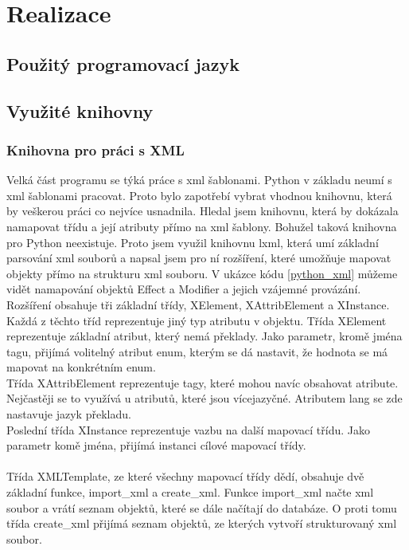 \documentclass[thesis=B,czech]{resources/FITthesis}[2012/06/26]
\begin{document}
\chapter{Realizace}
\section{Použitý programovací jazyk}

\section{Využité knihovny}
\subsection{Knihovna pro práci s XML}
Velká část programu se týká práce s xml šablonami. Python v základu neumí s xml šablonami pracovat. Proto bylo zapotřebí vybrat vhodnou knihovnu, která by veškerou práci co nejvíce usnadnila. Hledal jsem knihovnu, která by dokázala namapovat třídu a její atributy přímo na xml šablony. Bohužel taková knihovna pro Python neexistuje. Proto jsem využil knihovnu lxml, která umí základní parsování xml souborů a napsal jsem pro ní rozšíření, které umožňuje mapovat objekty přímo na strukturu xml souboru. V ukázce kódu \ref{python_xml} můžeme vidět namapování objektů Effect a Modifier a jejich vzájemné provázání. \\
Rozšíření obsahuje tři základní třídy, XElement, XAttribElement a XInstance. Každá z těchto tříd reprezentuje jiný typ atributu v objektu. Třída XElement reprezentuje základní atribut, který nemá překlady. Jako parametr, kromě jména tagu, přijímá volitelný atribut enum, kterým se dá nastavit, že hodnota se má mapovat na konkrétním enum.\\
Třída XAttribElement reprezentuje tagy, které mohou navíc obsahovat atribute. Nejčastěji se to využívá u atributů, které jsou vícejazyčné. Atributem lang se zde nastavuje jazyk překladu.\\
Poslední třída XInstance reprezentuje vazbu na další mapovací třídu. Jako parametr komě jména, přijímá instanci cílové mapovací třídy.\\
\\
Třída XMLTemplate, ze které všechny mapovací třídy dědí, obsahuje dvě základní funkce, import\_xml a create\_xml. Funkce import\_xml načte xml soubor a vrátí seznam objektů, které se dále načítají do databáze. O proti tomu třída create\_xml přijímá seznam objektů, ze kterých vytvoří strukturovaný xml soubor.
\end{document}
